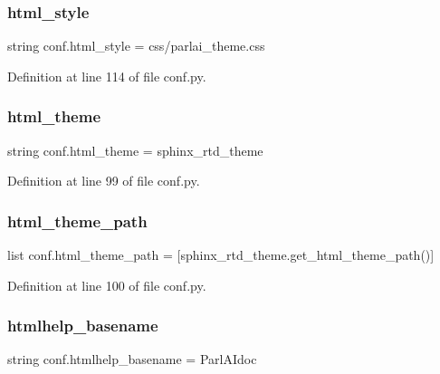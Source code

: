 \subsubsection{\texorpdfstring{html\+\_\+style}{html\_style}}
{\footnotesize\ttfamily string conf.\+html\+\_\+style = \textquotesingle{}css/parlai\+\_\+theme.\+css\textquotesingle{}}



Definition at line 114 of file conf.\+py.

\mbox{\label{namespaceconf_a6c3bfcc1a44546c1c75ce20f55bd0fd6}} 
\subsubsection{\texorpdfstring{html\+\_\+theme}{html\_theme}}
{\footnotesize\ttfamily string conf.\+html\+\_\+theme = \textquotesingle{}sphinx\+\_\+rtd\+\_\+theme\textquotesingle{}}



Definition at line 99 of file conf.\+py.

\mbox{\label{namespaceconf_a4960231f83b1b44a1ffcd212903b62e8}} 
\subsubsection{\texorpdfstring{html\+\_\+theme\+\_\+path}{html\_theme\_path}}
{\footnotesize\ttfamily list conf.\+html\+\_\+theme\+\_\+path = \mbox{[}sphinx\+\_\+rtd\+\_\+theme.\+get\+\_\+html\+\_\+theme\+\_\+path()\mbox{]}}



Definition at line 100 of file conf.\+py.

\mbox{\label{namespaceconf_aab7fddb2766ce3c430d8246fbfdbc7b1}} 
\subsubsection{\texorpdfstring{htmlhelp\+\_\+basename}{htmlhelp\_basename}}
{\footnotesize\ttfamily string conf.\+htmlhelp\+\_\+basename = \textquotesingle{}Parl\+A\+Idoc\textquotesingle{}}



